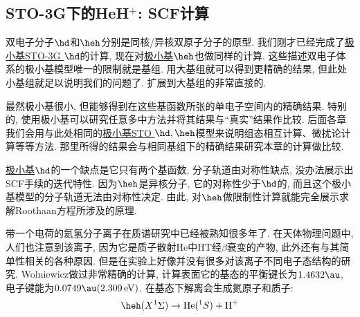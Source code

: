 \subsection{STO-3G下的HeH$^+$: SCF计算}
双电子分子$\hd$和$\heh$分别是同核/异核双原子分子的原型. 我们刚才已经完成了\underline{极小基STO-3G $\hd$}的计算, 现在对\underline{极小基$\heh$}也做同样的计算. 这些描述双电子体系的极小基模型唯一的限制就是基组. 用大基组就可以得到更精确的结果, 但此处小基组就足以说明我们的问题了. 扩展到大基组的非常直接的. 

最然极小基很小, 但能够得到在这些基函数所张的单电子空间内的精确结果. 特别的, 使用极小基可以研究任意多中方法并将其结果与``真实''结果作比较. 后面各章我们会用与此处相同的\underline{极小基STO $\hd,\heh$}模型来说明组态相互计算、微扰论计算等等方法. 那里所得的结果会与相同基组下的精确结果研究本章的\hft 计算做比较.

\underline{极小基$\hd$}的一个缺点是它只有两个基函数, 分子轨道由对称性缺点, 没办法展示出SCF手续的迭代特性. 因为$\heh$是异核分子, 它的对称性少于$\hd$的, 而且这个极小基模型的分子轨道无法由对称性决定. 由此, 对$\heh$做限制性\hft 计算就能完全展示求解Roothaan方程所涉及的原理. 

带一个电荷的氦氢分子离子在质谱研究中已经被熟知很多年了. 在天体物理问题中, 人们也注意到该离子, 因为它是质子散射$\mathrm{He}$中$\mathrm{HT}$经$\beta$衰变的产物, 此外还有与其简单性相关的各种原因. 但是在实验上好像并没有很多对该离子不同电子态结构的研究. Wolniewicz做过非常精确的计算, 计算表面它的基态的平衡键长为$1.4632\au$, 电子键能为$0.0749\au(2.309\,\mathrm{eV})$. 在基态下解离会生成氦原子和质子:
\begin{align}
\heh(X^1\Sigma) \to \mathrm{He}(^1S) + \mathrm{H}^+
\end{align}

